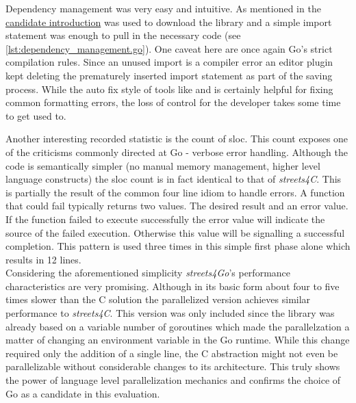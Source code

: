 Dependency management was very easy and intuitive. As mentioned in the \hyperref[subsec:State_of_the_art::Candidates::Go]{candidate introduction}  was used to download the library and a simple import statement was enough to pull in the necessary code (see \autoref{lst:dependency_management.go}). One caveat here are once again Go's strict compilation rules. Since an unused import is a compiler error an editor plugin kept deleting the prematurely inserted import statement as part of the saving process. While the auto fix style of tools like  and  is certainly helpful for fixing common formatting errors, the loss of control for the developer takes some time to get used to.

Another interesting recorded statistic is the count of \acrlong{sloc}. This count exposes one of the criticisms commonly directed at Go - verbose error handling. Although the code is semantically simpler (no manual memory management, higher level language constructs) the \gls{sloc} count is in fact identical to that of \textit{streets4C}. This is partially the result of the common four line idiom to handle errors. A function that could fail typically returns two values. The desired result and an error value. If the function failed to execute successfully the error value will indicate the source of the failed execution. Otherwise this value will be  signalling a successful completion. This pattern is used three times in this simple first phase alone which results in 12 lines.
\\


Considering the aforementioned simplicity \textit{streets4Go}'s performance characteristics are very promising. Although in its basic form about four to five times slower than the C solution the parallelized version achieves similar performance to \textit{streets4C}. This version was only included since the library was already based on a variable number of \glspl{goroutine} which made the parallelzation a matter of changing an environment variable in the Go runtime. While this change required only the addition of a single line, the C abstraction  might not even be parallelizable without considerable changes to its architecture. This truly shows the power of language level parallelization mechanics and confirms the choice of Go as a candidate in this evaluation.

